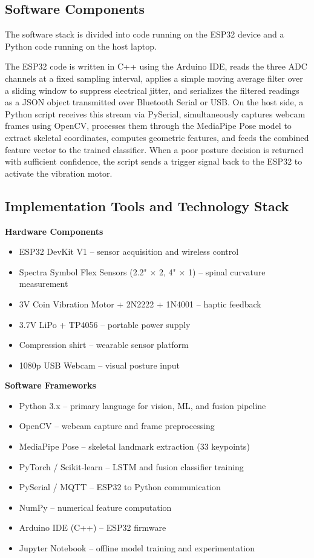 \documentclass[conference]{IEEEtran}
\begin{document}
\subsection{Software Components}

The software stack is divided into code running on the 
ESP32 device and a Python code running on the host laptop.

The ESP32 code is written in C++ using the Arduino IDE, 
reads the three ADC channels at a fixed sampling interval, 
applies a simple moving average filter over a sliding window 
to suppress electrical jitter, and serializes the filtered 
readings as a JSON object transmitted over Bluetooth Serial 
or USB. On the host side, a Python script receives this 
stream via PySerial, simultaneously captures webcam frames 
using OpenCV, processes them through the MediaPipe Pose 
model to extract skeletal coordinates, computes geometric 
features, and feeds the combined feature vector to the 
trained classifier. When a poor posture decision is returned 
with sufficient confidence, the script sends a trigger 
signal back to the ESP32 to activate the vibration motor.

\subsection{Implementation Tools and Technology Stack}

\textbf{Hardware Components}
\begin{itemize}
    \item ESP32 DevKit V1 -- sensor acquisition and wireless 
    control
    \item Spectra Symbol Flex Sensors (2.2" $\times$ 2, 
    4" $\times$ 1) -- spinal curvature measurement
    \item 3V Coin Vibration Motor + 2N2222 + 1N4001 -- 
    haptic feedback
    \item 3.7V LiPo + TP4056 -- portable power supply
    \item Compression shirt -- wearable sensor platform
    \item 1080p USB Webcam -- visual posture input
\end{itemize}

\textbf{Software Frameworks}
\begin{itemize}
    \item Python 3.x -- primary language for vision, ML, 
    and fusion pipeline
    \item OpenCV -- webcam capture and frame preprocessing
    \item MediaPipe Pose -- skeletal landmark extraction 
    (33 keypoints)
    \item PyTorch / Scikit-learn -- LSTM and fusion 
    classifier training
    \item PySerial / MQTT -- ESP32 to Python communication
    \item NumPy -- numerical feature computation
    \item Arduino IDE (C++) -- ESP32 firmware
    \item Jupyter Notebook -- offline model training and 
    experimentation
\end{itemize}
\end{document}
